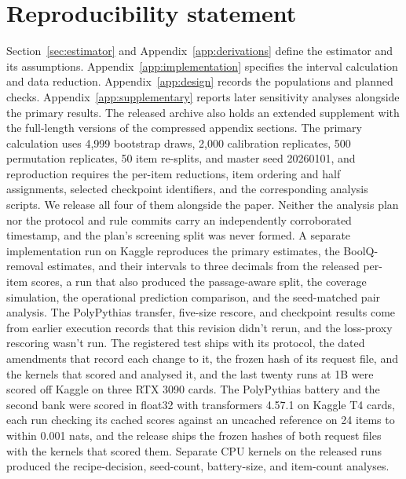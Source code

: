 \section*{Reproducibility statement}
Section~\ref{sec:estimator} and Appendix~\ref{app:derivations} define the estimator and its assumptions. Appendix~\ref{app:implementation} specifies the interval calculation and data reduction. Appendix~\ref{app:design} records the populations and planned checks. Appendix~\ref{app:supplementary} reports later sensitivity analyses alongside the primary results. The released archive also holds an extended supplement with the full-length versions of the compressed appendix sections. The primary calculation uses 4,999 bootstrap draws, 2,000 calibration replicates, 500 permutation replicates, 50 item re-splits, and master seed 20260101, and reproduction requires the per-item reductions, item ordering and half assignments, selected checkpoint identifiers, and the corresponding analysis scripts. We release all four of them alongside the paper. Neither the analysis plan nor the protocol and rule commits carry an independently corroborated timestamp, and the plan's screening split was never formed. A separate implementation run on Kaggle reproduces the primary estimates, the BoolQ-removal estimates, and their intervals to three decimals from the released per-item scores, a run that also produced the passage-aware split, the coverage simulation, the operational prediction comparison, and the seed-matched pair analysis. The PolyPythias transfer, five-size rescore, and checkpoint results come from earlier execution records that this revision didn't rerun, and the loss-proxy rescoring wasn't run. The registered test ships with its protocol, the dated amendments that record each change to it, the frozen hash of its request file, and the kernels that scored and analysed it, and the last twenty runs at 1B were scored off Kaggle on three RTX 3090 cards. The PolyPythias battery and the second bank were scored in float32 with transformers 4.57.1 on Kaggle T4 cards, each run checking its cached scores against an uncached reference on 24 items to within 0.001 nats, and the release ships the frozen hashes of both request files with the kernels that scored them. Separate CPU kernels on the released runs produced the recipe-decision, seed-count, battery-size, and item-count analyses.

